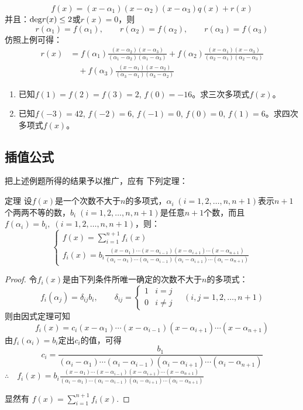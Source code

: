 \begin{solution}
\[f(x)=(x-\alpha_1)(x-\alpha_2)(x-\alpha_3)q(x)+r(x)\]
并且：${\rm deg}r(x)\le 2$或$r(x)=0$，则
\[r(\alpha_1)=f(\alpha_1),\qquad r(\alpha_2)=f(\alpha_2),\qquad r(\alpha_3)=f(\alpha_3)\]
 仿照上例可得：
 \[\begin{split}
     r(x)&=f(\alpha_1)\frac{(x-\alpha_2)(x-\alpha_3)}{(\alpha_1-\alpha_2)(\alpha_1-\alpha_3)} +f(\alpha_2)\frac{(x-\alpha_1)(x-\alpha_3)}{(\alpha_2-\alpha_1)(\alpha_2-\alpha_3)}
     \\
&\quad     +f(\alpha_3)\frac{(x-\alpha_1)(x-\alpha_2)}{(\alpha_3-\alpha_1)(\alpha_3-\alpha_2)}
 \end{split}\]
\end{solution}

\begin{ex}
\begin{enumerate}
    \item 已知$f(1)=f(2)=f(3)=2$, $f(0)=-16$。求三次多项式$f(x)$。
    \item 已知$f(-3)=42$, $f(-2)=6$, $f(-1)=0$, $f(0)=0$, $f(1)=6$。求四次多项式$f(x)$。
\end{enumerate} 
\end{ex}

\subsection{插值公式}

把上述例题所得的结果予以推广，应有
下列定理：

\begin{blk}{定理}
    设$f(x)$是一个次数不大于$n$的多项式，$\alpha_i\; (i=1, 2,\ldots,n,n+1)$表示$n+1$个两两不等的数，$b_i\; (i=1, 2,\ldots,n,n+1)$是任意$n+1$个数，而且
$f (\alpha_i) =b_i,\; (i=1, 2,\ldots,n,n+1)$，则：
\[\begin{cases}
   f(x)=\sum^{n+1}_{i=1} f_i(x)\\
   f_i(x)=b_i\frac{(x-\alpha_1)\cdots(x-\alpha_{i-1})(x-\alpha_{i+1})\cdots (x-\alpha_{n+1})}{(\alpha_i-\alpha_1)\cdots(\alpha_i-\alpha_{i-1})(\alpha_i-\alpha_{i+1})\cdots (\alpha_i-\alpha_{n+1})}
\end{cases}\]
\end{blk}

\begin{proof}
令$f_i(x)$是由下列条件所唯一确定的次数不大于$n$的多项式：
\[f_i(\alpha_j)=\delta_{ij}b_i,\qquad \delta_{ij}=\begin{cases}
    1&i=j\\
    0&i\ne j
\end{cases}\quad (i,j=1,2,\ldots,n+1)\]
则由因式定理可知
\[f_i(x)=c_i(x-\alpha_1)\cdots(x-\alpha_{i-1})(x-\alpha_{i+1})\cdots (x-\alpha_{n+1})\]
由$f_i(\alpha_i)=b_i$定出$c_i$的值，可得
\[c_i=\frac{b_1}{(\alpha_i-\alpha_1)\cdots(\alpha_i-\alpha_{i-1})(\alpha_i-\alpha_{i+1})\cdots (\alpha_i-\alpha_{n+1})}\]
$\therefore\quad f_i(x)=b_i\frac{(x-\alpha_1)\cdots(x-\alpha_{i-1})(x-\alpha_{i+1})\cdots (x-\alpha_{n+1})}{(\alpha_i-\alpha_1)\cdots(\alpha_i-\alpha_{i-1})(\alpha_i-\alpha_{i+1})\cdots (\alpha_i-\alpha_{n+1})}$

显然有 $f(x)=\displaystyle\sum^{n+1}_{i=1} f_i(x)$.
\end{proof}

